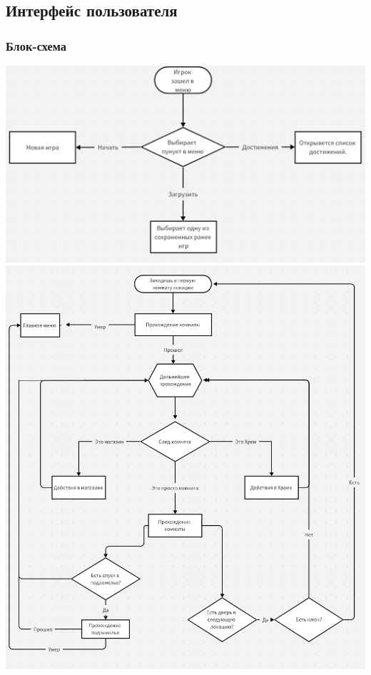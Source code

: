 \documentclass{article}
\begin{document}
\subsection{Интерфейс пользователя}
\subsubsection{Блок-схема}
\includegraphics[width=1\linewidth]{images/Bs-menu.png}
\includegraphics[width=1\linewidth]{images/Bs-loc.png}
\end{document}
